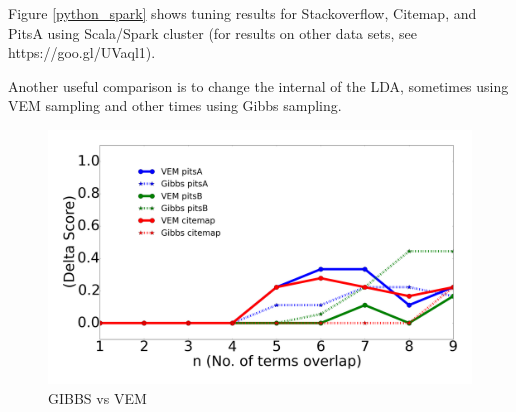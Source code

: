\documentclass[twocolumn,5p,sort&compress]{elsarticle}
\theoremstyle{break}
\begin{document}
Figure \ref{python_spark} shows tuning results for Stackoverflow, Citemap, and PitsA 
   using Scala/Spark cluster (for results on other data sets, see https://goo.gl/UVaql1).
   
  Another useful comparison is to change the internal of the LDA, sometimes using VEM sampling and other times using Gibbs sampling.


\begin{figure}[!htbp]
  \captionsetup{justification=centering}
  \includegraphics[width=\linewidth]{./fig/gibbs_vem1.png}
  \caption{GIBBS vs VEM}
  \label{gibbs_vem}
\end{figure}
\end{document}
